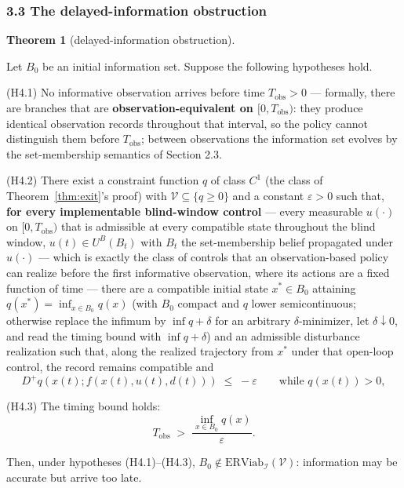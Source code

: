 \documentclass[10pt,twocolumn]{article}
\theoremstyle{definition}
\newtheorem{theorem}{Theorem}
\begin{document}
\subsubsection{3.3 The delayed-information
obstruction}\label{the-delayed-information-obstruction}

\begin{theorem}[delayed-information obstruction]\label{thm:delayed}

Let \(B_0\) be an initial information set. Suppose the following
hypotheses hold.

(H4.1) No informative observation arrives before time
\(T_{\mathrm{obs}} > 0\) --- formally, there are branches that are
\textbf{observation-equivalent on \([0, T_{\mathrm{obs}})\)}: they
produce identical observation records throughout that interval, so the
policy cannot distinguish them before \(T_{\mathrm{obs}}\); between
observations the information set evolves by the set-membership semantics
of Section 2.3.

(H4.2) There exist a constraint function \(q\) of class \(C^1\) (the
class of Theorem~\ref{thm:exit}'s proof) with \(\mathcal{V} \subseteq \{ q \ge 0 \}\)
and a constant \(\varepsilon > 0\) such that, \textbf{for every implementable blind-window control} --- every
measurable \(u(\cdot)\) on \([0, T_{\mathrm{obs}})\) that is admissible at
every compatible state throughout the blind window, \(u(t) \in U^B(B_t)\)
with \(B_t\) the set-membership belief propagated under \(u(\cdot)\) ---
which is exactly the class of controls that an observation-based policy
can realize before the first informative observation, where its actions
are a fixed function of time --- there are a compatible initial state \(x^* \in B_0\) attaining
\(q(x^*) = \inf_{x \in B_0} q(x)\) (with \(B_0\) compact and \(q\) lower
semicontinuous; otherwise replace the infimum by \(\inf q + \delta\) for
an arbitrary \(\delta\)-minimizer, let \(\delta \downarrow 0\), and read
the timing bound with \(\inf q + \delta\)) and an admissible disturbance
realization such that, along the realized trajectory from \(x^*\) under
that open-loop control, the record remains compatible and
\[D^+ q(x(t); f(x(t), u(t), d(t))) \;\le\; -\varepsilon \qquad \text{while } q(x(t)) > 0, \tag{3}\]

(H4.3) The timing bound holds:
\[T_{\mathrm{obs}} \;>\; \frac{\inf_{x \in B_0} q(x)}{\varepsilon}. \tag{4}\]

Then, under hypotheses (H4.1)--(H4.3),
\(B_0 \notin \mathrm{ERViab}_{\mathcal{I}}(\mathcal{V})\): information
may be accurate but arrive too late.

\end{theorem}
\end{document}
